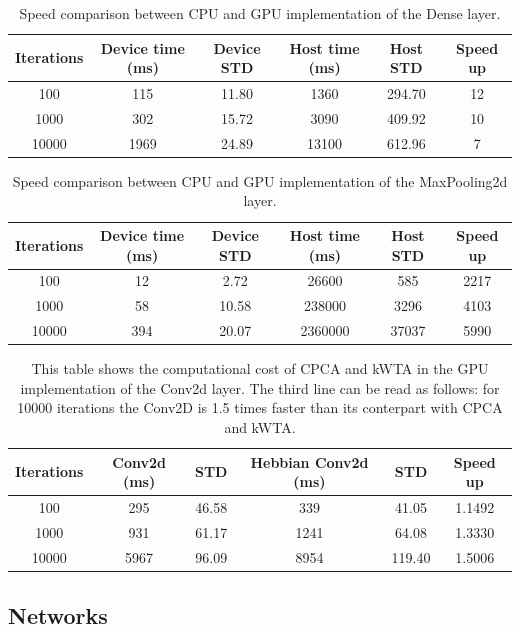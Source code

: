 \documentclass[11pt]{report}
\begin{document}
\begin{table}[h!]
\centering
\begin{tabular}{ c c c c c c }
Iterations & Device time (ms) & Device STD & Host time (ms) & Host STD & Speed up\\
\hline
100   & 115  & 11.80 & 1360  & 294.70 & 12 \\
1000  & 302  & 15.72 & 3090  & 409.92 & 10 \\
10000 & 1969 & 24.89 & 13100 & 612.96 & 7
\end{tabular}
\caption[Speed benchmark: Dense layer]{Speed comparison between CPU and GPU implementation of the Dense layer.}
\end{table}

\begin{table}[h!]
\centering
\begin{tabular}{ c c c c c c }
Iterations & Device time (ms) & Device STD & Host time (ms) & Host STD & Speed up\\
\hline
100   & 12  & 2.72  & 26600   & 585   & 2217 \\
1000  & 58  & 10.58  & 238000  & 3296  & 4103 \\
10000 & 394 & 20.07 & 2360000 & 37037 & 5990
\end{tabular}
\caption[Speed benchmark: MaxPooling2d layer]{Speed comparison between CPU and GPU implementation of the MaxPooling2d layer.}
\end{table}

\begin{table}[!htb]
\centering
\begin{tabular}{ c | c c | c c | c }
Iterations & Conv2d (ms) & STD & Hebbian Conv2d (ms) & STD & Speed up\\
\hline
100   & 295  & 46.58 & 339  & 41.05  & 1.1492 \\
1000  & 931  & 61.17 & 1241 & 64.08  & 1.3330 \\
10000 & 5967 & 96.09 & 8954 & 119.40 & 1.5006
\end{tabular}
\caption[Speed benchmark: Computational cost of CPCA and kWTA]{This table shows the computational cost of CPCA and kWTA in the GPU implementation of the Conv2d layer. The third line can be read as follows: for 10000 iterations the Conv2D is 1.5 times faster than its conterpart with CPCA and kWTA.}\label{table:CNN_vs_HCNN}
\end{table}
\FloatBarrier

\subsection{Networks}
\end{document}
